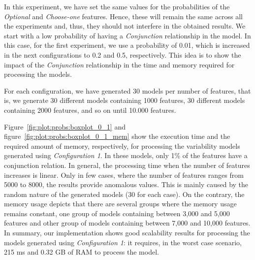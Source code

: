 In this experiment, we have set the same values for the probabilities of the \textit{Optional}
and \textit{Choose-one} features. Hence, these will remain the same
across all the experiments and, thus, they should not interfere in the obtained results.
We start with a low probability of having a \textit{Conjunction} relationship in the model. In this
case, for the first experiment, we use a probability of 0.01, which is increased in the next configurations
to 0.2 and 0.5, respectively. This idea is to show the impact of the \textit{Conjunction} relationship in the time
and memory required for processing the models.

For each configuration, we have generated 30 models per number of features, that is, we generate
30 different models containing 1000 features, 30 different models containing 2000 features,
and so on until 10.000 features.

Figure~\ref{fig:plot:probs:boxplot_0_1} and figure~\ref{fig:plot:probs:boxplot_0_1_mem} show the execution time and the required amount of memory, respectively, for processing the variability models generated using \textit{Configuration 1}. In these models, only 1\% of the features have a conjunction relation. In general, the processing time when the number of features increases is linear. Only in few cases, where the number of features ranges from 5000 to 8000, the results provide anomalous values. This is mainly caused by the random nature of the generated models (30 for each case). On the contrary, the memory usage depicts that there are several groups where the memory usage remains constant, one group of models containing between 3,000 and 5,000 features and other group of models containing between 7,000 and 10,000 features. In summary, our implementation shows good scalability results for processing the models generated using \textit{Configuration 1}: it requires, in the worst case scenario, 215 ms and 0.32 GB of RAM to process the model.

